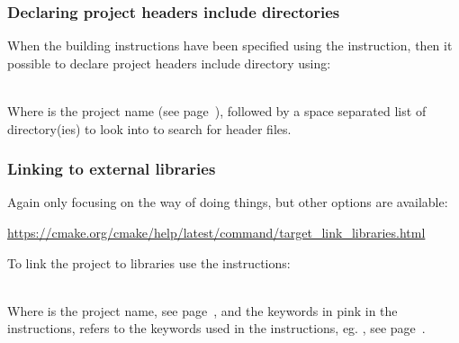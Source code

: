\subsubsection*{Declaring project headers include directories}

When the building instructions have been specified using the  instruction, then it possible to declare project headers include directory using: 
\begin{script}
\end{script} \\[-0.5cm]
\noindent Where  is the project name (see page~\pageref{cmake_pname}), followed by a space separated list of directory(ies) to look into to search for header files. 

\subsubsection*{Linking to external libraries}
\label{clink}
Again only focusing on the  way of doing things, but other options are available:
\begin{center}\href{https://cmake.org/cmake/help/latest/command/target\_link\_libraries.html}{https://cmake.org/cmake/help/latest/command/target\_link\_libraries.html} \end{center}
To link the project to libraries use the  instructions:
\begin{script}
\end{script}
\\[-0.25cm]
\noindent Where  is the project name, see page~\pageref{cmake_pname}, and the keywords in pink in the  instructions, 
refers to the keywords used in the  instructions, eg. \texttt{}, see page~\pageref{cmake_deps}.

